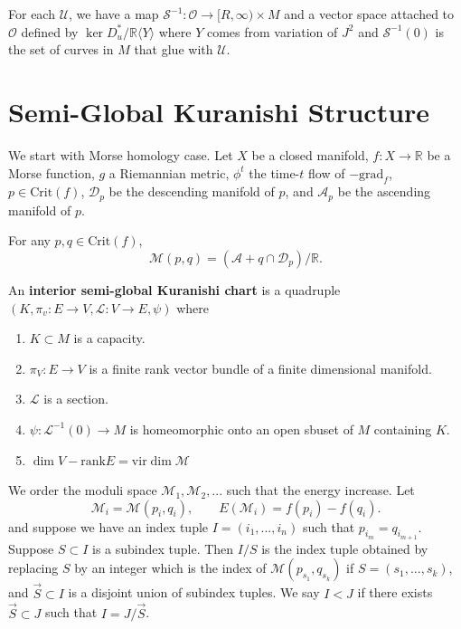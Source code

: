 For each $\mathcal{U}$, we have a map $\mathcal{S}^{-1}: \mathcal{O}\to [R,\infty)\times M$ and a vector space attached to $\mathcal{O}$ defined by $\ker D_u^*/\mathbb{R} \langle Y \rangle$ where $Y$ comes from variation of $J^2$ and $\mathcal{S}^{-1}(0)$ is the set of curves in $M$ that glue with $\mathcal{U}$.

\section{Semi-Global Kuranishi Structure}

We start with Morse homology case. Let $X$ be a closed manifold, $f: X\to \mathbb{R}$ be a Morse function, $g$ a Riemannian metric, $\phi^t$ the time-$t$ flow of $-\text{grad}_f$, $p\in \text{Crit}(f)$, $\mathcal{D}_p$ be the descending manifold of $p$, and $\mathcal{A}_p$ be the ascending manifold of $p$.

For any $p, q \in \text{Crit}(f)$, 
\[\mathcal{M}(p,q)= \left( \mathcal{A}+q \cap \mathcal{D}_p \right)/\mathbb{R}.
\]

\begin{definition}

An \textbf{interior semi-global Kuranishi chart} is a quadruple $(K, \pi_v: E\to V, \mathcal{L}:V\to E, \psi)$ where
\begin{enumerate}
\item $K\subset M$ is a capacity.
\item $\pi_V: E\to V$ is a finite rank vector bundle of a finite dimensional manifold.
\item $\mathcal{L}$ is a section.
\item $\psi: \mathcal{L}^{-1}(0) \to M$ is homeomorphic onto an open sbuset of $M$ containing $K$.
\item $\dim V - \text{rank} E =\text{vir} \dim\mathcal{M}$
\end{enumerate}

\end{definition}

We order the moduli space $\mathcal{M}_1, \mathcal{M}_2,...$ such that the energy increase. Let
\[
\mathcal{M}_i=\mathcal{M}(p_i, q_i), \qquad E(\mathcal{M}_i)=f(p_i)-f(q_i).
\]
and suppose we have an index tuple $I=(i_1,...,i_n)$ such that $p_{i_m}=q_{i_{m+1}}$. Suppose $S\subset I$ is a subindex tuple. Then $I/S$ is the index tuple obtained by replacing $S$ by an integer which is the index of $\mathcal{M}(p_{s_1}, q_{s_k})$ if $S=(s_1,...,s_k)$, and $\vec{S}\subset I$ is a disjoint union of subindex tuples. We say $I<J$ if there exists $\vec{S} \subset J$ such that $I=J/\vec{S}$.

